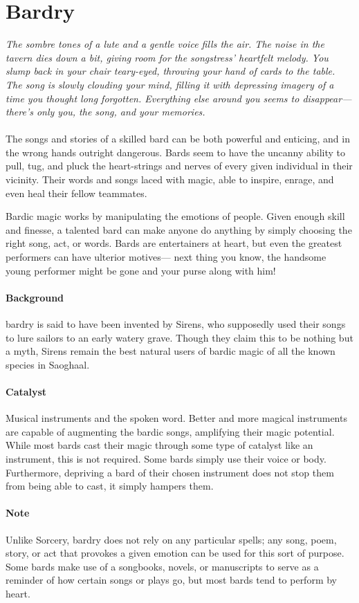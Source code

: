 \section{Bardry}
\textit{The sombre tones of a lute and a gentle voice fills the air.
The noise in the tavern dies down a bit, giving room for the songstress' heartfelt melody.
You slump back in your chair teary-eyed, throwing your hand of cards to the table.
The song is slowly clouding your mind, filling it with depressing imagery of a time you thought long forgotten.
Everything else around you seems to disappear---there's only you, the song, and your memories.}\\\\
The songs and stories of a skilled bard can be both powerful and enticing, and in the wrong hands outright dangerous.
Bards seem to have the uncanny ability to pull, tug, and pluck the heart-strings and nerves of every given individual in their vicinity.
Their words and songs laced with magic, able to inspire, enrage, and even heal their fellow teammates.

Bardic magic works by manipulating the emotions of people. 
Given enough skill and finesse, a talented bard can make anyone do anything by simply choosing the right song, act, or words.
Bards are entertainers at heart, but even the greatest performers can have ulterior motives---
next thing you know, the handsome young performer might be gone and your purse along with him!

\paragraph{Background} bardry is said to have been invented by Sirens, who supposedly used their songs to lure sailors to an early watery grave.
Though they claim this to be nothing but a myth, Sirens remain the best natural users of bardic magic of all the known species in Saoghaal.

\paragraph{Catalyst} Musical instruments and the spoken word.
Better and more magical instruments are capable of augmenting the bardic songs, amplifying their magic potential.
While most bards cast their magic through some type of catalyst like an instrument, this is not required. 
Some bards simply use their voice or body. 
Furthermore, depriving a bard of their chosen instrument does not stop them from being able to cast, it simply hampers them.

\paragraph{Note} Unlike Sorcery, bardry does not rely on any particular spells; 
any song, poem, story, or act that provokes a given emotion can be used for this sort of purpose.
Some bards make use of a songbooks, novels, or manuscripts to serve as a reminder of how certain songs or plays go, but most bards tend to perform by heart.